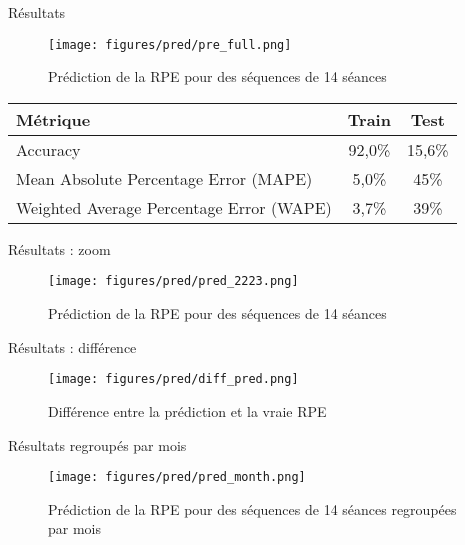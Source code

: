 \documentclass{beamer}
\begin{document}
\begin{frame}{Résultats}
    \begin{figure}
        \centering
        \texttt{[image: figures/pred/pre\_full.png]}
        \caption{Prédiction de la RPE pour des séquences de 14 séances}
    \end{figure}
    \begin{table}
        \centering
        \begin{tabular}{lcc}
            \hline
            \textbf{Métrique} & \textbf{Train} & \textbf{Test}\\
            \hline
            Accuracy & 92,0\% & 15,6\%  \\
            Mean Absolute Percentage Error (MAPE) & 5,0\% & 45\%\\
            Weighted Average Percentage Error (WAPE) & 3,7\% & 39\% \\
            \hline
        \end{tabular}
    \end{table}
\end{frame}
\begin{frame}{Résultats : zoom}
    \begin{figure}
        \centering
        \hspace*{-1.05cm}
        \texttt{[image: figures/pred/pred\_2223.png]}
        \caption{Prédiction de la RPE pour des séquences de 14 séances}
    \end{figure}
\end{frame}
    \begin{frame}{Résultats : différence}
    \begin{figure}
        \hspace*{-1.05cm}
        \texttt{[image: figures/pred/diff\_pred.png]}
        \caption{Différence entre la prédiction et la vraie RPE}
    \end{figure}
\end{frame}

\begin{frame}{Résultats regroupés par mois}
    \begin{figure}
        \centering
        \hspace*{-1.05cm}
        \texttt{[image: figures/pred/pred\_month.png]} 
        \caption{Prédiction de la RPE pour des séquences de 14 séances regroupées par mois}
    \end{figure}
\end{frame}
\end{document}
